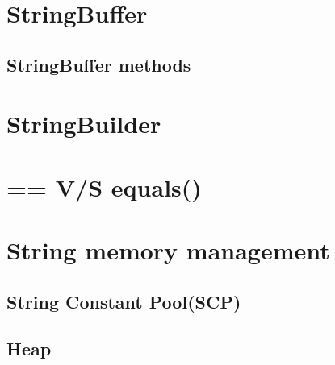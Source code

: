 \documentclass[14pt,fleqn]{extbook} %
\begin{document}
\section{StringBuffer}


\subsection{StringBuffer methods}
	
\section{StringBuilder}

%	
%
\section{== V/S equals()}

\section{String memory management}

\subsection{String Constant Pool(SCP)}
	
\subsection{Heap}
	



\end{document}
